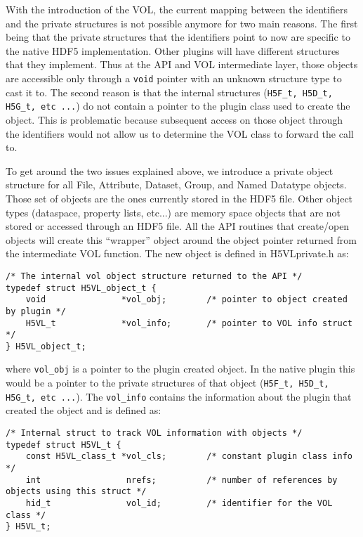 With the introduction of the VOL, the current mapping between the identifiers and the private structures is not possible anymore for two main reasons. The first being that the private structures that the identifiers point to now are specific to the native HDF5 implementation. Other plugins will have different structures that they implement. Thus at the API and VOL intermediate layer, those objects are accessible only through a {\tt void} pointer with an unknown structure type to cast it to. The second reason is that the internal structures ({\tt H5F\_t, H5D\_t, H5G\_t,  etc ...}) do not contain a pointer to the plugin class used to create the object. This is problematic because subsequent access on those object through the identifiers would not allow us to determine the VOL class to forward the call to.

To get around the two issues explained above, we introduce a private object structure for all File, Attribute, Dataset, Group, and Named Datatype objects. Those set of objects are the ones currently stored in the HDF5 file. Other object types (dataspace, property lists, etc...) are memory space objects that are not stored or accessed through an HDF5 file. All the API routines that create/open objects will create this ``wrapper'' object around the object pointer returned from the intermediate VOL function.  The new object is defined in {H5VLprivate.h} as:

\begin{lstlisting}
/* The internal vol object structure returned to the API */
typedef struct H5VL_object_t {
    void               *vol_obj;        /* pointer to object created by plugin */
    H5VL_t             *vol_info;       /* pointer to VOL info struct */
} H5VL_object_t;
\end{lstlisting}

where {\tt vol\_obj} is a pointer to the plugin created object. In the native plugin this would be a pointer to the private structures of that object ({\tt H5F\_t, H5D\_t, H5G\_t,  etc ...}). The {\tt vol\_info} contains the information about the plugin that created the object and is defined as:

\begin{lstlisting}
/* Internal struct to track VOL information with objects */
typedef struct H5VL_t {
    const H5VL_class_t *vol_cls;        /* constant plugin class info */
    int                 nrefs;          /* number of references by objects using this struct */
    hid_t               vol_id;         /* identifier for the VOL class */
} H5VL_t;
\end{lstlisting}

